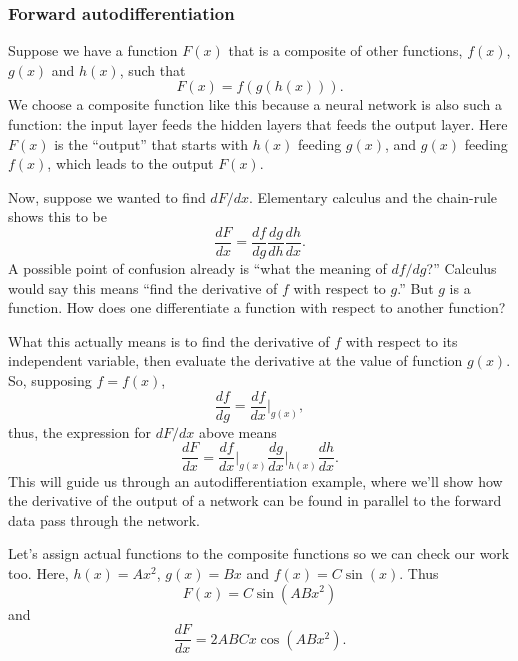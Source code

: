 \documentclass[12pt]{article}
\begin{document}
\subsubsection{Forward autodifferentiation}

Suppose we have a function $F(x)$ that is a composite of other functions, $f(x)$, $g(x)$ and $h(x)$, such that
\begin{equation}
F(x)=f(g(h(x))).
\end{equation}
We choose a composite function like this because a neural network is also such a function: the input layer feeds the hidden layers that feeds the output layer.  Here $F(x)$ is the ``output'' that starts with $h(x)$ feeding $g(x)$, and $g(x)$ feeding $f(x)$, which leads to the output $F(x)$.

Now, suppose  we wanted to find $dF/dx$. Elementary calculus and the chain-rule shows this to be
\begin{equation}
\frac{dF}{dx}=\frac{df}{dg}\frac{dg}{dh}\frac{dh}{dx}.
\end{equation}
A possible point of confusion already is ``what the meaning of $df/dg$?'' Calculus would say this means ``find the derivative of $f$ with respect to $g$.'' But $g$ is a function.  How does one differentiate a function with respect to another function?

What this actually means is to find the derivative of $f$ with respect to its independent variable, then evaluate the derivative at the value of function $g(x)$. So, supposing $f=f(x)$,
\begin{equation}
\frac{df}{dg}=\frac{df}{dx}\bigg\rvert_{g(x)},
\end{equation}
thus, the expression for $dF/dx$ above means
\begin{equation}
\frac{dF}{dx}=\frac{df}{dx}\bigg\rvert_{g(x)}\frac{dg}{dx}\bigg\rvert_{h(x)}\frac{dh}{dx}.
\end{equation}
This will guide us through an autodifferentiation example, where we'll show how the derivative of the output of a network can be found in parallel to the forward data pass through the network.

Let's assign actual functions to the composite functions so we can check our work too. Here, $h(x)=Ax^2$, $g(x)=Bx$ and $f(x)=C\sin(x)$.  Thus
\begin{equation}
F(x)=C\sin(ABx^2)
\end{equation}
and
\begin{equation}
\frac{dF}{dx}=2ABCx\cos(ABx^2).
\end{equation}
\end{document}
